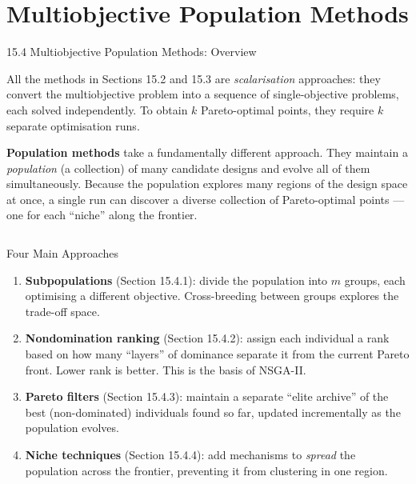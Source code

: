 \documentclass[aspectratio=169,10pt]{beamer}
\begin{document}
\section{Multiobjective Population Methods}

\begin{frame}[allowframebreaks]{15.4 Multiobjective Population Methods: Overview}

All the methods in Sections 15.2 and 15.3 are \emph{scalarisation} approaches:
they convert the multiobjective problem into a sequence of single-objective
problems, each solved independently.  To obtain $k$ Pareto-optimal points,
they require $k$ separate optimisation runs.

\textbf{Population methods} take a fundamentally different approach.  They
maintain a \emph{population} (a collection) of many candidate designs and
evolve all of them simultaneously.  Because the population explores many
regions of the design space at once, a single run can discover a diverse
collection of Pareto-optimal points --- one for each ``niche'' along the
frontier.

\begin{columns}
\begin{block}{Four Main Approaches}
  \begin{enumerate}
    \item \textbf{Subpopulations} (Section 15.4.1): divide the population into
      $m$ groups, each optimising a different objective.  Cross-breeding
      between groups explores the trade-off space.

    \item \textbf{Nondomination ranking} (Section 15.4.2): assign each
      individual a rank based on how many ``layers'' of dominance separate it
      from the current Pareto front.  Lower rank is better.  This is the
      basis of NSGA-II.

    \item \textbf{Pareto filters} (Section 15.4.3): maintain a separate
      ``elite archive'' of the best (non-dominated) individuals found so far,
      updated incrementally as the population evolves.

    \item \textbf{Niche techniques} (Section 15.4.4): add mechanisms to
      \emph{spread} the population across the frontier, preventing it from
      clustering in one region.
  \end{enumerate}
\end{block}


\end{columns}
\end{frame}
\end{document}
